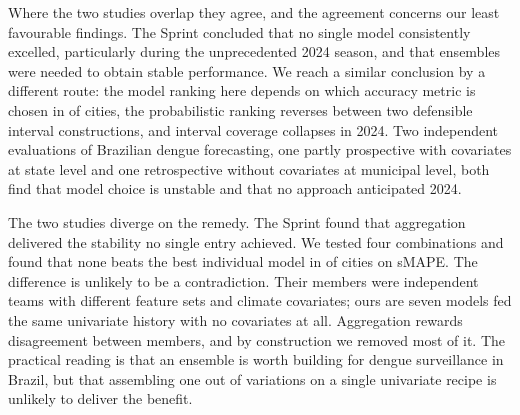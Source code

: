 \documentclass[10pt,letterpaper]{article}
\begin{document}
{Where the two studies overlap they agree, and the agreement concerns our least favourable findings. The Sprint concluded that no single model consistently excelled, particularly during the unprecedented 2024 season, and that ensembles were needed to obtain stable performance. We reach a similar conclusion by a different route: the model ranking here depends on which accuracy metric is chosen in  of  cities, the probabilistic ranking reverses between two defensible interval constructions, and interval coverage collapses in 2024. Two independent evaluations of Brazilian dengue forecasting, one partly prospective with covariates at state level and one retrospective without covariates at municipal level, both find that model choice is unstable and that no approach anticipated 2024.

The two studies diverge on the remedy. The Sprint found that aggregation delivered the stability no single entry achieved. We tested four combinations and found that none beats the best individual model in  of  cities on sMAPE. The difference is unlikely to be a contradiction. Their members were independent teams with different feature sets and climate covariates; ours are seven models fed the same univariate history with no covariates at all. Aggregation rewards disagreement between members, and by construction we removed most of it. The practical reading is that an ensemble is worth building for dengue surveillance in Brazil, but that assembling one out of variations on a single univariate recipe is unlikely to deliver the benefit.

}
\end{document}
